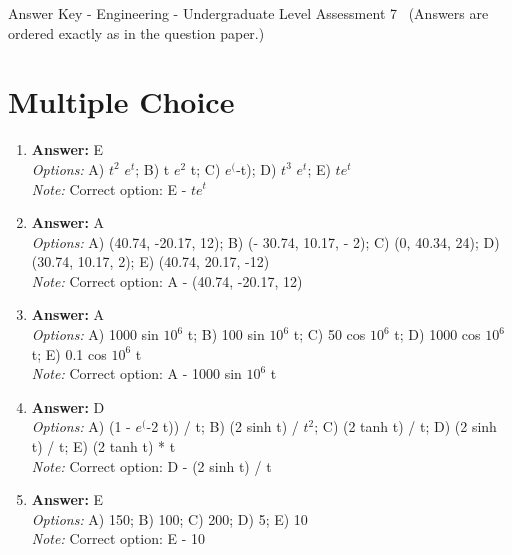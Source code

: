 \documentclass[12pt]{article}
\begin{document}
\begin{center}
Answer Key - Engineering - Undergraduate Level Assessment 7 \
\small (Answers are ordered exactly as in the question paper.)
\end{center}

\section*{Multiple Choice}
\begin{enumerate}[label=\arabic*.]
\item \textbf{Answer:} E
\\ \textit{Options:} A) $t^2$ $e^t$; B) t $e^2$ t; C) $e^($-t); D) $t^3$ $e^t$; E) $te^t$
\\ \textit{Note:} Correct option: E - $te^t$
\item \textbf{Answer:} A
\\ \textit{Options:} A) (40.74, -20.17, 12); B) (- 30.74, 10.17, - 2); C) (0, 40.34, 24); D) (30.74, 10.17, 2); E) (40.74, 20.17, -12)
\\ \textit{Note:} Correct option: A - (40.74, -20.17, 12)
\item \textbf{Answer:} A
\\ \textit{Options:} A) 1000 sin $10^6$ t; B) 100 sin $10^6$ t; C) 50 cos $10^6$ t; D) 1000 cos $10^6$ t; E) 0.1 cos $10^6$ t
\\ \textit{Note:} Correct option: A - 1000 sin $10^6$ t
\item \textbf{Answer:} D
\\ \textit{Options:} A) (1 - $e^($-2 t)) / t; B) (2 sinh t) / $t^2$; C) (2 tanh t) / t; D) (2 sinh t) / t; E) (2 tanh t) * t
\\ \textit{Note:} Correct option: D - (2 sinh t) / t
\item \textbf{Answer:} E
\\ \textit{Options:} A) 150; B) 100; C) 200; D) 5; E) 10
\\ \textit{Note:} Correct option: E - 10
\end{enumerate}
\end{document}
